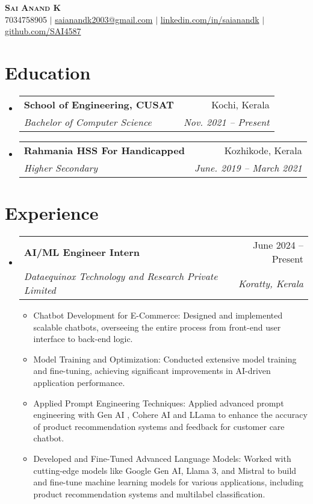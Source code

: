 \documentclass[letterpaper,11pt]{article}
\makeatletter
\newcommand{\resumeItem}[1]{
  \item\small{
    {#1 \vspace{-2pt}}
  }
}
\newcommand{\resumeSubheading}[4]{
  \vspace{-2pt}\item
    \begin{tabular*}{0.97\textwidth}[t]{l@{\extracolsep{\fill}}r}
      \textbf{#1} & #2 \\
      \textit{\small#3} & \textit{\small #4} \\
    \end{tabular*}\vspace{-7pt}
}
\newcommand{\resumeSubHeadingListStart}{\begin{itemize}[leftmargin=0.15in, label={}]}
\newcommand{\resumeSubHeadingListEnd}{\end{itemize}}
\newcommand{\resumeItemListStart}{\begin{itemize}}
\newcommand{\resumeItemListEnd}{\end{itemize}\vspace{-5pt}}
\makeatother
\begin{document}
\begin{center}
    \textbf{\Huge \scshape Sai Anand K} \\ \vspace{1pt}
    \small 7034758905 $|$ \href{mailto:saianandk2003@gmail.com}{{saianandk2003@gmail.com}} $|$ 
    \href{https://linkedin.com/in/saianandk}{{linkedin.com/in/saianandk}} $|$
    \href{https://github.com/SAI4587}{{github.com/SAI4587}}
\end{center}


\section{Education}
  \resumeSubHeadingListStart
    \resumeSubheading
      {School of Engineering, CUSAT}{Kochi, Kerala}
      {Bachelor of Computer Science}{Nov. 2021 -- Present}
    \resumeSubheading
      {Rahmania HSS For Handicapped}{Kozhikode, Kerala}
      {Higher Secondary}{June. 2019 -- March 2021}
  \resumeSubHeadingListEnd


\section{Experience}
  \resumeSubHeadingListStart

    \resumeSubheading
      {AI/ML Engineer Intern}{June 2024 -- Present}
      {Dataequinox Technology and Research Private Limited}{Koratty, Kerala}
      \resumeItemListStart
        \resumeItem{Chatbot Development for E-Commerce: Designed and implemented scalable chatbots, overseeing the entire process from front-end user interface to back-end logic.}
        \resumeItem{Model Training and Optimization: Conducted extensive model training and fine-tuning, achieving significant improvements in AI-driven application performance.}
        \resumeItem{Applied Prompt Engineering Techniques: Applied advanced prompt engineering with Gen AI , Cohere AI and LLama to enhance the accuracy of product recommendation systems and feedback for customer care chatbot.}
        \resumeItem{Developed and Fine-Tuned Advanced Language Models: Worked with cutting-edge models like Google Gen AI, Llama 3, and Mistral to build and fine-tune machine learning models for various applications, including product recommendation systems and multilabel classification.}
      \resumeItemListEnd

  \resumeSubHeadingListEnd


\end{document}
